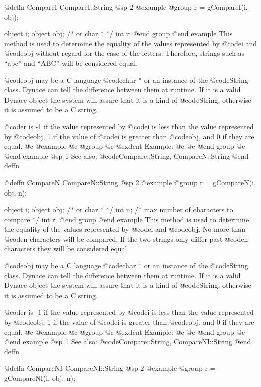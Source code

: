 @deffn {CompareI} CompareI::String
@sp 2
@example
@group
r = gCompareI(i, obj);

object  i;
object  obj;  /*  or char *  */
int     r;
@end group
@end example
This method is used to determine the equality of the values represented
by @code{i} and @code{obj} without regard for the case of the letters.
Therefore, strings such as ``abc'' and ``ABC'' will be considered equal.

@code{obj} may be a C language @code{char *} or an instance of the
@code{String} class.  Dynace can tell the difference between them at
runtime.  If it is a valid Dynace object the system will assure that it is
a kind of @code{String}, otherwise it is assumed to be a C string.

@code{r} is -1 if the value represented by @code{i} is less than the
value represented by @code{obj}, 1 if the value of @code{i} is greater
than @code{obj}, and 0 if they are equal.
@c @example
@c @group
@c @exdent Example:
@c
@c @end group
@c @end example
@sp 1
See also:  @code{Compare::String, CompareN::String}
@end deffn






@deffn {CompareN} CompareN::String
@sp 2
@example
@group
r = gCompareN(i, obj, n);

object  i;
object  obj;  /*  or char *  */
int     n;    /*  max number of characters to compare  */
int     r;
@end group
@end example
This method is used to determine the equality of the values represented
by @code{i} and @code{obj}.  No more than @code{n} characters will be
compared. If the two strings only differ past @code{n} characters they
will be considered equal.


@code{obj} may be a C language @code{char *} or an instance of the
@code{String} class.  Dynace can tell the difference between them at
runtime.  If it is a valid Dynace object the system will assure that it is
a kind of @code{String}, otherwise it is assumed to be a C string.

@code{r} is -1 if the value represented by @code{i} is less than the
value represented by @code{obj}, 1 if the value of @code{i} is greater
than @code{obj}, and 0 if they are equal.
@c @example
@c @group
@c @exdent Example:
@c
@c @end group
@c @end example
@sp 1
See also:  @code{Compare::String, CompareNI::String}
@end deffn





@deffn {CompareNI} CompareNI::String
@sp 2
@example
@group
r = gCompareNI(i, obj, n);

